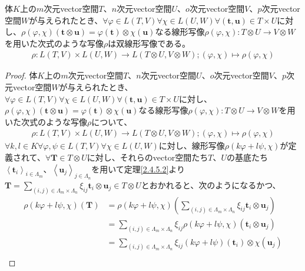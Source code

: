 \documentclass[dvipdfmx]{jsarticle}
\begin{document}
\begin{thm}\label{2.4.5.11}
体$K$上の$m$次元vector空間$T$、$n$次元vector空間$U$、$o$次元vector空間$V$、$p$次元vector空間$W$が与えられたとき、$\forall\varphi \in L(T,V)\forall\chi \in L(U,W)\forall\left( \mathbf{t},\mathbf{u} \right) \in T \times U$に対し、$\rho(\varphi,\chi)\left( \mathbf{t} \otimes \mathbf{u} \right) = \varphi\left( \mathbf{t} \right) \otimes \chi\left( \mathbf{u} \right)$なる線形写像$\rho(\varphi,\chi):T \otimes U \rightarrow V \otimes W$を用いた次式のような写像$\rho$は双線形写像である。
\begin{align*}
\rho:L(T,V) \times L(U,W) \rightarrow L(T \otimes U,V \otimes W);(\varphi,\chi) \mapsto \rho(\varphi,\chi)
\end{align*}
\end{thm}
\begin{proof}
体$K$上の$m$次元vector空間$T$、$n$次元vector空間$U$、$o$次元vector空間$V$、$p$次元vector空間$W$が与えられたとき、$\forall\varphi \in L(T,V)\forall\chi \in L(U,W)\forall\left( \mathbf{t},\mathbf{u} \right) \in T \times U$に対し、$\rho(\varphi,\chi)\left( \mathbf{t} \otimes \mathbf{u} \right) = \varphi\left( \mathbf{t} \right) \otimes \chi\left( \mathbf{u} \right)$なる線形写像$\rho(\varphi,\chi):T \otimes U \rightarrow V \otimes W$を用いた次式のような写像$\rho$について、
\begin{align*}
\rho:L(T,V) \times L(U,W) \rightarrow L(T \otimes U,V \otimes W);(\varphi,\chi) \mapsto \rho(\varphi,\chi)
\end{align*}
$\forall k,l \in K\forall\varphi,\psi \in L(T,V)\forall\chi \in L(U,W)$に対し、線形写像$\rho(k\varphi + l\psi,\chi)$が定義されて、$\forall\mathbf{T} \in T \otimes U$に対し、それらのvector空間たち$T$、$U$の基底たち$\left\langle \mathbf{t}_{i} \right\rangle_{i \in \varLambda_{m}}$、$\left\langle \mathbf{u}_{j} \right\rangle_{j \in \varLambda_{n}}$を用いて定理\ref{2.4.5.2}より$\mathbf{T} = \sum_{(i,j) \in \varLambda_{m} \times \varLambda_{n}} {\xi_{ij}\mathbf{t}_{i} \otimes \mathbf{u}_{j}} \in T \otimes U$とおかれると、次のようになるかつ、
\begin{align*}
\rho(k\varphi + l\psi,\chi)\left( \mathbf{T} \right) &= \rho(k\varphi + l\psi,\chi)\left( \sum_{(i,j) \in \varLambda_{m} \times \varLambda_{n}} {\xi_{ij}\mathbf{t}_{i} \otimes \mathbf{u}_{j}} \right)\\
&= \sum_{(i,j) \in \varLambda_{m} \times \varLambda_{n}} {\xi_{ij}\rho(k\varphi + l\psi,\chi)\left( \mathbf{t}_{i} \otimes \mathbf{u}_{j} \right)}\\
&= \sum_{(i,j) \in \varLambda_{m} \times \varLambda_{n}} {\xi_{ij}(k\varphi + l\psi)\left( \mathbf{t}_{i} \right) \otimes \chi\left( \mathbf{u}_{j} \right)}\\

\end{align*}
\end{proof}
\end{document}
